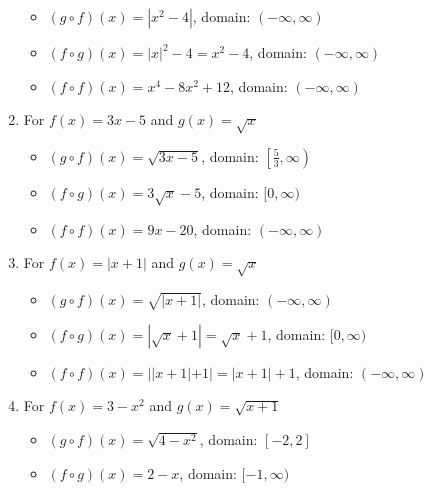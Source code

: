 \begin{enumerate}
\begin{itemize}

\item  $(g \circ f)(x) = |x^2-4|$, domain: $(-\infty, \infty)$

\item  $(f \circ g)(x) =|x|^2-4 = x^2-4$, domain: $(-\infty, \infty)$

\item  $(f \circ f)(x) =x^4-8x^2+12$, domain: $(-\infty, \infty)$

\end{itemize}

\item For   $f(x) = 3x-5$ and $g(x) = \sqrt{x}$ 

\begin{itemize}

\item  $(g \circ f)(x) = \sqrt{3x-5}$, domain: $\left[ \frac{5}{3}, \infty \right)$

\item  $(f \circ g)(x) = 3\sqrt{x}-5$, domain: $[0,\infty)$

\item  $(f \circ f)(x) = 9x-20$, domain: $(-\infty, \infty)$

\end{itemize}


\item For   $f(x) = |x+1|$ and $g(x) = \sqrt{x}$

\begin{itemize}

\item  $(g \circ f)(x) = \sqrt{|x+1|}$, domain: $(-\infty, \infty)$

\item  $(f \circ g)(x) = |\sqrt{x}+1| = \sqrt{x}+1$, domain: $[0,\infty)$

\item  $(f \circ f)(x) = ||x+1|+1| = |x+1|+1$, domain: $(-\infty, \infty)$

\end{itemize}


\item For   $f(x) = 3-x^2$ and $g(x) = \sqrt{x+1}$ 

\begin{itemize}

\item  $(g \circ f)(x) = \sqrt{4-x^2}$, domain: $[-2,2]$

\item  $(f \circ g)(x) =2-x$, domain: $[-1, \infty)$


\end{itemize}
\end{enumerate}
